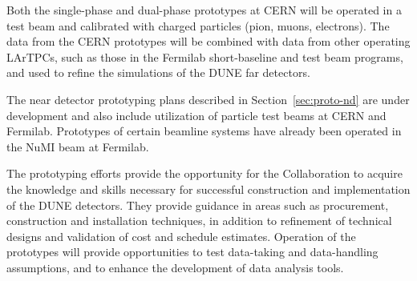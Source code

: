 Both the single-phase and dual-phase prototypes at CERN will be
operated in a test beam and calibrated with charged particles (pion,
muons, electrons). The data from the CERN prototypes will be combined
with data from other operating LArTPCs, such as those in the Fermilab
short-baseline and test beam programs, and used to refine the
simulations of the DUNE far detectors.

The near detector prototyping plans described in
Section~\ref{sec:proto-nd} are under development and also include
utilization of particle test beams at CERN and Fermilab.  Prototypes
of certain beamline systems have already been operated in the NuMI
beam at Fermilab.

The prototyping efforts provide the opportunity for the Collaboration
to acquire the knowledge and skills necessary for successful
construction and implementation of the DUNE detectors. They provide
guidance in areas such as procurement, construction and installation
techniques, in addition to refinement of technical designs and validation of
cost and schedule estimates.  Operation of the prototypes will provide
opportunities to test data-taking and data-handling assumptions, and
to enhance the development of data analysis tools.


